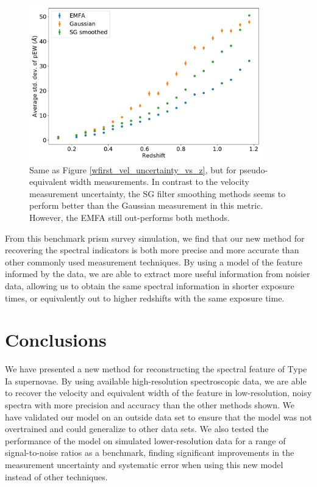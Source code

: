 \begin{figure}[htbp]
    \centering
    \includegraphics[width=0.9\textwidth]{figures/si_feat_pca/wfirst_pew_uncert.pdf}
    \caption{Same as Figure \ref{wfirst_vel_uncertainty_vs_z}, but for pseudo-equivalent width measurements. In contrast to the velocity measurement uncertainty, the SG filter smoothing methods seems to perform better than the Gaussian measurement in this metric. However, the EMFA still out-performs both methods.}
    \label{wfirst_ew_uncertainty_vs_z}
\end{figure}

From this benchmark prism survey simulation, we find that our new method for recovering the \siliconii{} spectral indicators is both more precise and more accurate than other commonly used measurement techniques. By using a model of the feature informed by the data, we are able to extract more useful information from noisier data, allowing us to obtain the same spectral information in shorter exposure times, or equivalently out to higher redshifts with the same exposure time.

\section{Conclusions}
\label{conclusions}
We have presented a new method for reconstructing the \siliconii{} spectral feature of Type Ia supernovae. By using available high-resolution spectroscopic data, we are able to recover the velocity and equivalent width of the feature in low-resolution, noisy spectra with more precision and accuracy than the other methods shown. We have validated our model on an outside data set to ensure that the model was not overtrained and could generalize to other data sets. We also tested the performance of the model on simulated lower-resolution data for a range of signal-to-noise ratios as a benchmark, finding significant improvements in the measurement uncertainty and systematic error when using this new model instead of other techniques.

